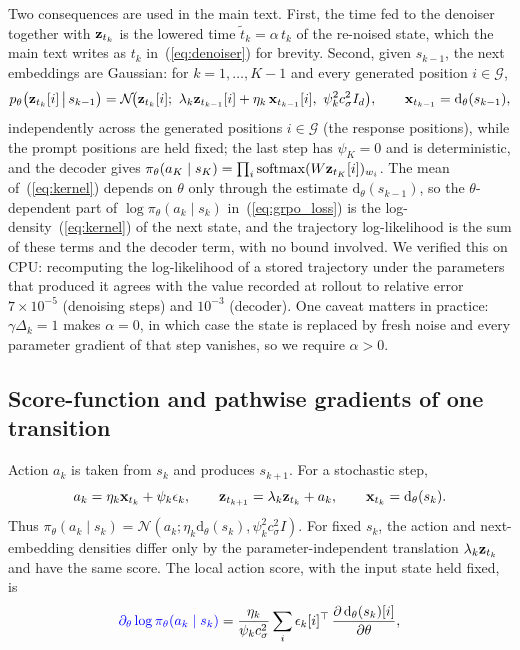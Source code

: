 Two consequences are used in the main text. First, the time fed to the denoiser together with ${\mathbf{z}}_{t_k}$ is the lowered time $\tilde t_k=\alpha\,t_k$ of the re-noised state, which the main text writes as $t_k$ in~(\ref{eq:denoiser}) for brevity. Second, given $s_{k-1}$, the next embeddings are Gaussian: for $k=1,\dots,K-1$ and every generated position $i\in\mathcal G$,
\begin{equation}
p_\theta\big(\rvz_{t_k}[i]\,\big|\,s_{k-1}\big)=\mathcal N\!\big(\rvz_{t_k}[i];\ \lambda_k\rvz_{t_{k-1}}[i]+\eta_k\,\rvx_{t_{k-1}}[i],\ \psi_k^2c_\sigma^2I_d\big),\qquad \rvx_{t_{k-1}}=\mathrm d_\theta(s_{k-1}),
\label{eq:kernel}
\end{equation}
independently across the generated positions $i\in\mathcal G$ (the response positions), while the prompt positions are held fixed; the last step has $\psi_K=0$ and is deterministic, and the decoder gives $\pi_\theta(a_K\mid s_K)=\prod_i\mathrm{softmax}(W{\mathbf{z}}_{t_K}[i])_{w_i}$. The mean of~(\ref{eq:kernel}) depends on $\theta$ only through the estimate $\mathrm d_\theta(s_{k-1})$, so the $\theta$-dependent part of $\log\pi_\theta(a_k\mid s_k)$ in~(\ref{eq:grpo_loss}) is the log-density~(\ref{eq:kernel}) of the next state, and the trajectory log-likelihood is the sum of these terms and the decoder term, with no bound involved. We verified this on CPU: recomputing the log-likelihood of a stored trajectory under the parameters that produced it agrees with the value recorded at rollout to relative error $7\times10^{-5}$ (denoising steps) and $10^{-3}$ (decoder). One caveat matters in practice: $\gamma\Delta_k=1$ makes $\alpha=0$, in which case the state is replaced by fresh noise and every parameter gradient of that step vanishes, so we require $\alpha>0$.

\subsection{Score-function and pathwise gradients of one transition}
\label{app:variance}
\begingroup
\color{blue}
Action $a_k$ is taken from $s_k$ and produces $s_{k+1}$. For a stochastic step,
\[
a_k=\eta_k{\mathbf{x}}_{t_k}+\psi_k\epsilon_k,
\qquad {\mathbf{z}}_{t_{k+1}}=\lambda_k{\mathbf{z}}_{t_k}+a_k,
\qquad {\mathbf{x}}_{t_k}=\mathrm d_\theta(s_k).
\]
Thus $\pi_\theta(a_k\mid s_k)=\mathcal N(a_k;\eta_k\mathrm d_\theta(s_k),\psi_k^2c_\sigma^2I)$. For fixed $s_k$, the action and next-embedding densities differ only by the parameter-independent translation $\lambda_k{\mathbf{z}}_{t_k}$ and have the same score. The local action score, with the input state held fixed, is
\endgroup
\begin{equation}
\textcolor{blue}{\partial_\theta\log\pi_\theta(a_k\mid s_k)}=\frac{\eta_k}{\psi_k c_\sigma^2}\sum_{i}\epsilon_{k}[i]^{\top}\,\frac{\partial\,\mathrm d_\theta(s_k)[i]}{\partial\theta},
\label{eq:sf}
\end{equation}

